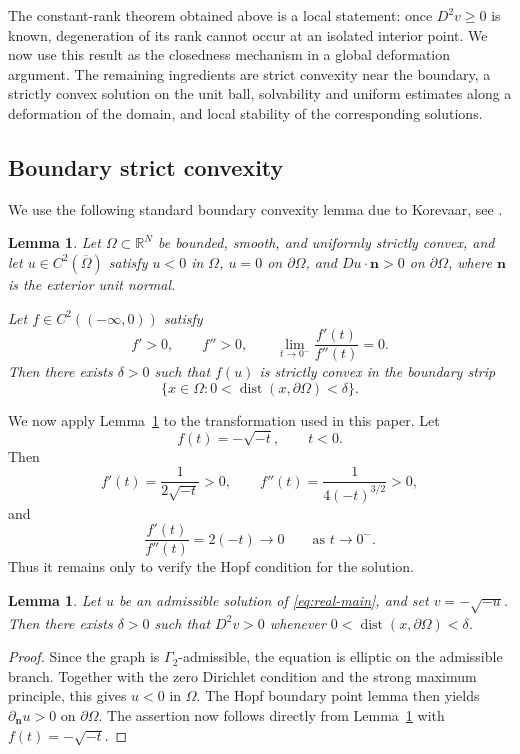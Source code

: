 \documentclass{article}
\newtheorem{lemma}[theorem]{Lemma}
\numberwithin{equation}{section}
\begin{document}
The constant-rank theorem obtained above is a local statement: once
$D^2v\ge 0$ is known, degeneration of its rank cannot occur at an
isolated interior point. We now use this result as the closedness
mechanism in a global deformation argument. The remaining ingredients
are strict convexity near the boundary, a strictly convex solution on
the unit ball, solvability and uniform estimates along a deformation
of the domain, and local stability of the corresponding solutions.

\subsection{Boundary strict convexity}
\label{subsubsec:real-boundary}

We use the following standard boundary convexity lemma due to
Korevaar, see \cite{Korevaar1983}. 

\begin{lemma}
\label{lem:boundary-convexity-general}
Let $\Omega\subset\mathbb R^N$ be bounded, smooth, and uniformly
strictly convex, and let $u\in C^2(\overline{\Omega})$ satisfy
$u<0$ in $\Omega$, $u=0$ on $\partial\Omega$, and
$Du\cdot\mathbf n>0$ on $\partial\Omega$, where $\mathbf n$ is the
exterior unit normal.

Let $f\in C^2((-\infty,0))$ satisfy
\[
f'>0,\qquad f''>0,\qquad
\lim_{t\to0^-}\frac{f'(t)}{f''(t)}=0.
\]
Then there exists $\delta>0$ such that $f(u)$ is strictly convex in
the boundary strip
\[
\{x\in\Omega:0<\operatorname{dist}(x,\partial\Omega)<\delta\}.
\]
\end{lemma}

We now apply Lemma~\ref{lem:boundary-convexity-general} to the
transformation used in this paper. Let
\[
f(t)=-\sqrt{-t},\qquad t<0.
\]
Then
\[
f'(t)=\frac{1}{2\sqrt{-t}}>0,
\qquad
f''(t)=\frac{1}{4(-t)^{3/2}}>0,
\]
and
\[
\frac{f'(t)}{f''(t)}
=2(-t)\longrightarrow0
\qquad\text{as }t\to0^-.
\]
Thus it remains only to verify the Hopf condition for the solution.

\begin{lemma}
\label{lem:real-boundary-strict}
Let $u$ be an admissible solution of \eqref{eq:real-main}, and set
$v=-\sqrt{-u}$. Then there exists $\delta>0$ such that
$D^2v>0$ whenever $0<\operatorname{dist}(x,\partial\Omega)<\delta$.
\end{lemma}

\begin{proof}
Since the graph is $\Gamma_2$-admissible, the equation is elliptic
on the admissible branch. Together with the zero Dirichlet condition
and the strong maximum principle, this gives $u<0$ in $\Omega$.
The Hopf boundary point lemma then yields
$\partial_{\mathbf n}u>0$ on $\partial\Omega$.
The assertion now follows directly from
Lemma~\ref{lem:boundary-convexity-general} with
$f(t)=-\sqrt{-t}$.
\end{proof}
\end{document}
